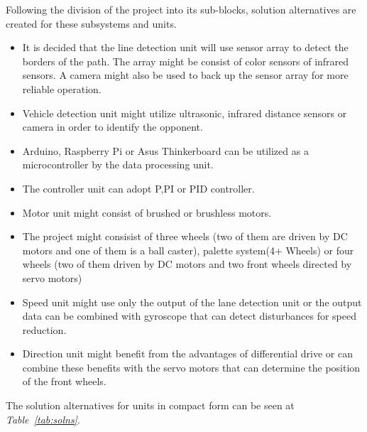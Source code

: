 \documentclass[a4paper,12pt]{article}
\begin{document}
	Following the division of the project into its sub-blocks, solution alternatives are created for these subsystems and units. 
		
	\begin{itemize}
		\item It is decided that the line detection unit will use sensor array to detect the borders of the path. The array might be consist of color sensors of infrared sensors. A camera might also be used to back up the sensor array for more reliable operation.	
		\item Vehicle detection unit might utilize ultrasonic, infrared distance sensors or camera in order to identify the opponent.
		\item  Arduino, Raspberry Pi or Asus Thinkerboard can be utilized as a microcontroller by the data processing unit.
		\item The controller unit can adopt P,PI or PID controller.
		\item Motor unit might consist of brushed or brushless motors.
		\item The project might consisist of three wheels (two of them are driven by DC motors and one of them is a ball caster), palette system(4+ Wheels) or four wheels (two of them driven by DC motors and two front wheels directed by servo motors)
		\item Speed unit might use only the output of the lane detection unit or the output data can be combined with gyroscope that can detect disturbances for speed reduction.  
		\item Direction unit might benefit from the advantages of differential drive or can combine these benefits with the servo motors that can determine the position of the front wheels.
	\end{itemize}	  
			
		The solution alternatives for units in compact form can be seen at \textit{Table~\ref{tab:solns}}.
	
\end{document}
